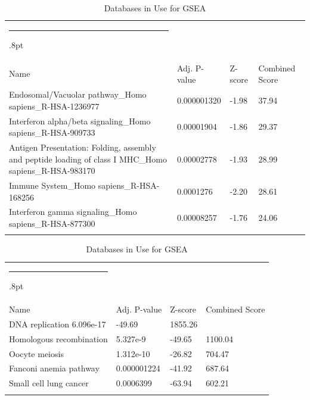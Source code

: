 \documentclass[3p,authoryear,preprint,12pt]{elsarticle}
\makeatletter
\def\hlinewd#1{%
  \noalign{\ifnum0=`}\fi\hrule \@height #1%
  \futurelet\reserved@a\@xhline}
\def\tbltoprule{\hlinewd{.8pt}\\[-12pt]}
\def\tblbottomrule{\noalign{\vspace*{6pt}}\hline\noalign{\vspace*{2pt}}}
\def\tblmidrule{\noalign{\vspace*{6pt}}\hline\noalign{\vspace*{2pt}}}
\makeatother
\begin{document}
\begin{table}[!htbp]
	\caption{{Databases in Use for GSEA} }
	\label{tw-de478ae31cc6}
	\def\arraystretch{1}
	\ignorespaces 
	\centering 
	\begin{tabulary}{\linewidth}{p{\dimexpr.65\tabcolsep}p{\dimexpr.15\tabcolsep}p{\dimexpr.1\tabcolsep}p{\dimexpr.1\tabcolsep}}
		\tbltoprule Name & Adj. P-value & Z-score & Combined Score\\
		\tblmidrule
Endosomal/Vacuolar pathway\_Homo sapiens\_R-HSA-1236977 & 0.000001320 & -1.98 & 37.94 \\
Interferon alpha/beta signaling\_Homo sapiens\_R-HSA-909733 & 0.00001904 & -1.86 & 29.37 \\
Antigen Presentation: Folding, assembly and peptide loading of class I MHC\_Homo sapiens\_R-HSA-983170 & 0.00002778 & -1.93 & 28.99 \\
Immune System\_Homo sapiens\_R-HSA-168256 & 0.0001276 & -2.20 & 28.61 \\
Interferon gamma signaling\_Homo sapiens\_R-HSA-877300 & 0.00008257 & -1.76 & 24.06 \\
		\tblbottomrule
	\end{tabulary}\par 
\end{table}
\begin{table}[!htbp]
	\caption{{Databases in Use for GSEA} }
	\label{tw-de478ae31cc6}
	\def\arraystretch{1}
	\ignorespaces 
	\centering 
	\begin{tabulary}{\linewidth}{p{\dimexpr.65\tabcolsep}p{\dimexpr.15\tabcolsep}p{\dimexpr.1\tabcolsep}p{\dimexpr.1\tabcolsep}}
		\tbltoprule Name & Adj. P-value & Z-score & Combined Score\\
		\tblmidrule
DNA replication	6.096e-17 & -49.69 & 1855.26 &  \\
Homologous recombination & 5.327e-9 & -49.65 & 1100.04 \\
Oocyte meiosis & 1.312e-10 & -26.82 & 704.47 \\
Fanconi anemia pathway & 0.000001224 & -41.92 & 687.64 \\
Small cell lung cancer & 0.0006399 & -63.94 & 602.21 \\
		\tblbottomrule
	\end{tabulary}\par 
\end{table}
\end{document}
